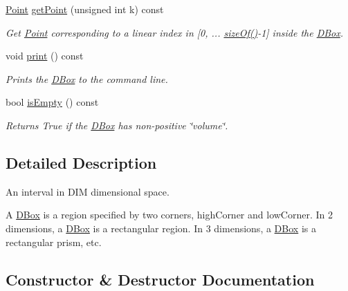 \begin{DoxyCompactItemize}
\mbox{\label{class_d_box_a4a8ff11e785cc9cffda3db6df356756a}} 
\hyperlink{class_point}{Point} \hyperlink{class_d_box_a4a8ff11e785cc9cffda3db6df356756a}{get\+Point} (unsigned int k) const
\begin{DoxyCompactList}\small\item\em Get \hyperlink{class_point}{Point} corresponding to a linear index in \mbox{[}0, ... \hyperlink{class_d_box_ae72c9edef6e3a49bd69fa3071990f5af}{size\+Of()}-\/1\mbox{]} inside the \hyperlink{class_d_box}{D\+Box}. \end{DoxyCompactList}\item 
\mbox{\label{class_d_box_a544c09543505750ef70a00ca286ccc45}} 
void \hyperlink{class_d_box_a544c09543505750ef70a00ca286ccc45}{print} () const
\begin{DoxyCompactList}\small\item\em Prints the \hyperlink{class_d_box}{D\+Box} to the command line. \end{DoxyCompactList}\item 
\mbox{\label{class_d_box_a45b77dcfdb5b4bf178b7b15389b6bc60}} 
bool \hyperlink{class_d_box_a45b77dcfdb5b4bf178b7b15389b6bc60}{is\+Empty} () const
\begin{DoxyCompactList}\small\item\em Returns True if the \hyperlink{class_d_box}{D\+Box} has non-\/positive \char`\"{}volume\char`\"{}. \end{DoxyCompactList}\end{DoxyCompactItemize}


\subsection{Detailed Description}
An interval in D\+IM dimensional space. 

A \hyperlink{class_d_box}{D\+Box} is a region specified by two corners, high\+Corner and low\+Corner. In 2 dimensions, a \hyperlink{class_d_box}{D\+Box} is a rectangular region. In 3 dimensions, a \hyperlink{class_d_box}{D\+Box} is a rectangular prism, etc. 

\subsection{Constructor \& Destructor Documentation}
\mbox{\label{class_d_box_a8a8c5c7cf3bbfee6ecd3372ced15a540}} 
